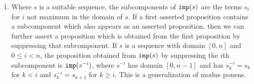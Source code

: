 \documentclass{article}
\begin{document}
\begin{enumerate}
\item  Where $s$ is a suitable sequence, the subcomponents of ${\tt imp}(s)$ are the terms $s_i$ for $i$ not maximum in the domain of $s$.  If a first asserted proposition
contains a subcomponent which also appears as an asserted proposition, then we can further assert a proposition which is obtained from the first proposition by suppressing that subcomponent.
If $s$ is a sequence with domain $[0,n]$ and $0\leq i<n$, the proposition obtained from ${\tt imp}(s)$ by suppressing the $i$th subcomponent is ${\tt imp}(s^{-i})$, where $s^{-i}$ has domain $[0,n-1]$ and has $s^{-i}_k = s_k$ for $k<i$ and $s^{-i}_k = s_{k+1}$ for $k \geq i$.  This is a generalization of modus ponens.

\end{enumerate}
\end{document}
